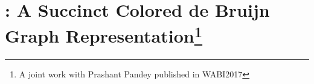  






%
\chapter{\rainbowfish: A Succinct Colored de Bruijn Graph Representation\protect\footnote{A joint work with Prashant Pandey published in WABI2017}}
\label{chap:rainbowfish}

